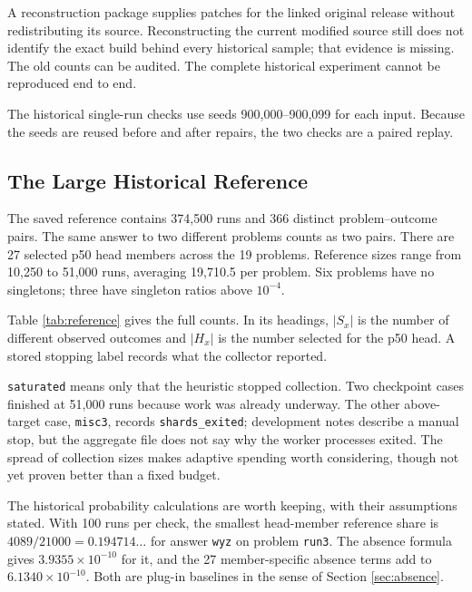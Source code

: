 \documentclass[10pt,letterpaper]{article}
\begin{document}
A reconstruction package supplies patches for the linked original release without
redistributing its source. Reconstructing the current modified source still does not
identify the exact build behind every historical sample; that evidence is missing. The old
counts can be audited. The complete historical experiment cannot be reproduced end to end.

The historical single-run checks use seeds 900,000--900,099 for each input. Because the
seeds are reused before and after repairs, the two checks are a paired replay.

\subsection{The Large Historical Reference}\label{sec:reference-results}

The saved reference contains 374,500 runs and 366 distinct problem--outcome pairs. The
same answer to two different problems counts as two pairs. There are 27 selected p50 head
members across the 19 problems. Reference sizes range from 10,250 to 51,000 runs,
averaging 19,710.5 per problem. Six problems have no singletons; three have singleton
ratios above \(10^{-4}\).

Table \ref{tab:reference} gives the full counts. In its headings, \(|S_x|\) is the number
of different observed outcomes and \(|H_x|\) is the number selected for the p50 head. A
stored stopping label records what the collector reported.



\texttt{saturated} means only that the heuristic stopped collection. Two checkpoint cases
finished at 51,000 runs because work was already underway. The other above-target case,
\texttt{misc3}, records \texttt{shards\_exited}; development notes describe a manual stop,
but the aggregate file does not say why the worker processes exited. The spread of
collection sizes makes adaptive spending worth considering, though not yet proven better
than a fixed budget.

The historical probability calculations are worth keeping, with their assumptions stated.
With 100 runs per check, the smallest head-member reference share is
\(4089/21000=0.194714\ldots\) for answer \texttt{wyz} on problem \texttt{run3}. The
absence formula gives \(3.9355\times10^{-10}\) for it, and the 27 member-specific absence
terms add to \(6.1340\times10^{-10}\). Both are plug-in baselines in the sense of Section
\ref{sec:absence}.
\end{document}
